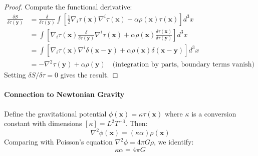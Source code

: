 \documentclass[11pt,titlepage]{article}
\begin{document}
\begin{proof}
Compute the functional derivative:
\begin{align*}
\frac{\delta S}{\delta \tau(\mathbf{y})} 
&= \frac{\delta}{\delta \tau(\mathbf{y})} \int \left[ \frac{1}{2} \nabla_i \tau(\mathbf{x}) \nabla^i \tau(\mathbf{x}) + \alpha \rho(\mathbf{x}) \tau(\mathbf{x}) \right] d^3x \\
&= \int \left[ \nabla_i \tau(\mathbf{x}) \frac{\delta}{\delta \tau(\mathbf{y})} \nabla^i \tau(\mathbf{x}) + \alpha \rho(\mathbf{x}) \frac{\delta \tau(\mathbf{x})}{\delta \tau(\mathbf{y})} \right] d^3x \\
&= \int \left[ \nabla_i \tau(\mathbf{x}) \nabla^i \delta(\mathbf{x} - \mathbf{y}) + \alpha \rho(\mathbf{x}) \delta(\mathbf{x} - \mathbf{y}) \right] d^3x \\
&= -\nabla^2 \tau(\mathbf{y}) + \alpha \rho(\mathbf{y}) \quad \text{(integration by parts, boundary terms vanish)}
\end{align*}
Setting $\delta S/\delta \tau = 0$ gives the result.
\end{proof}

\paragraph{Connection to Newtonian Gravity}
Define the gravitational potential $\phi(\mathbf{x}) = \kappa \tau(\mathbf{x})$ where $\kappa$ is a conversion constant with dimensions $[\kappa] = L^2 T^{-3}$. Then:
\[
\nabla^2 \phi(\mathbf{x}) = (\kappa \alpha) \rho(\mathbf{x})
\]
Comparing with Poisson's equation $\nabla^2 \phi = 4\pi G \rho$, we identify:
\[
\kappa \alpha = 4\pi G
\]
\end{document}
